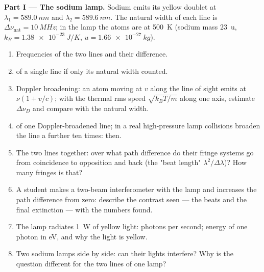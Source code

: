 \begin{problem}
\label{pb:b2:scalar-light-model:1}

\medskip
\noindent\textbf{Part I --- The sodium lamp.}
Sodium emits its yellow doublet at $\lambda_1 = \qty{589.0}{nm}$ and $\lambda_2 =
\qty{589.6}{nm}$. The natural width of each line is $\Delta\nu_{\text{nat}} =
\qty{10}{MHz}$; in the lamp the atoms are at \qty{500}{K} (sodium mass
\qty{23}{u}, $k_B = \qty{1.38e-23}{J/K}$, $u = \qty{1.66e-27}{kg}$).
\begin{enumerate}
  \item Frequencies of the two lines and their difference.
  \item {} of a single line if only its natural width
        counted.
  \item Doppler broadening: an atom moving at $v$ along the line of
        sight emits at $\nu(1 + v/c)$; with the thermal rms speed $\sqrt{k_BT
        /m}$ along one axis, estimate $\Delta\nu_D$ and compare with the
        natural width.
  \item {} of one Doppler-broadened line; in a real
        high-pressure lamp collisions broaden the line a further ten
        times:  then.
  \item The two lines together: over what path difference do their
        fringe systems go from coincidence to opposition and back
        (the "beat length" $\lambda^2/\Delta\lambda$)? How many fringes is that?
  \item A student makes a two-beam interferometer with the lamp and
        increases the path difference from zero: describe the
        contrast seen --- the beats and the final extinction --- with
        the numbers found.
  \item The lamp radiates \qty{1}{W} of yellow light: photons per second;
        energy of one photon in eV, and why the light is yellow.
  \item Two sodium lamps side by side: can their lights interfere?
        Why is the question different for the two lines of one lamp?
\end{enumerate}


\end{problem}
